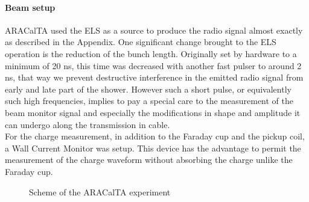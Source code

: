 \documentclass[12pt]{article}
\begin{document}
\paragraph{Beam setup}
ARACalTA used the ELS as a source to produce the radio signal almost exactly as described in the Appendix. One significant change brought to the ELS operation is the reduction of the bunch length. Originally set by hardware to a minimum of 20 ns, this time was decreased with another fast pulser to around 2 ns, that way we prevent destructive interference in the emitted radio signal from early and late part of the shower. However such a short pulse, or equivalently such high frequencies, implies to pay a special care to the measurement of the beam monitor signal and especially the modifications in shape and amplitude it can undergo along the transmission in cable.\\ For the charge measurement, in addition to the Faraday cup and the pickup coil, a Wall Current Monitor was setup. This device has the advantage to permit the measurement of the charge waveform without absorbing the charge unlike the Faraday cup.
\begin{figure}[!h]
  \centering
  \hspace*{-3ex}
  \caption{Scheme of the ARACalTA experiment}
  \label{fig:scheme}
\end{figure}
\end{document}
